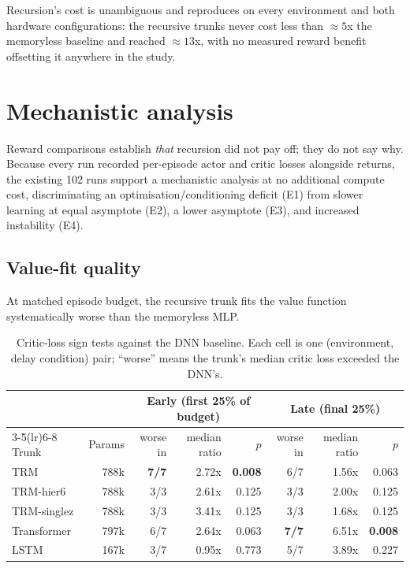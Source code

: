 \documentclass[11pt]{article}
\begin{document}
Recursion's cost is unambiguous and reproduces on every environment and both hardware configurations: the recursive trunks never cost less than ${\approx}5$x the memoryless baseline and reached ${\approx}13$x, with no measured reward benefit offsetting it anywhere in the study.

\section{Mechanistic analysis}
\label{sec:mechanism}

Reward comparisons establish \emph{that} recursion did not pay off; they do not say why. Because every run recorded per-episode actor and critic losses alongside returns, the existing 102 runs support a mechanistic analysis at no additional compute cost, discriminating an optimisation/conditioning deficit (E1) from slower learning at equal asymptote (E2), a lower asymptote (E3), and increased instability (E4).

\subsection{Value-fit quality}

At matched episode budget, the recursive trunk fits the value function systematically worse than the memoryless MLP.

\begin{table}[h]
\centering
\small
\begin{tabular}{lrrrrrrr}
\toprule
 & & \multicolumn{3}{c}{Early (first 25\% of budget)} & \multicolumn{3}{c}{Late (final 25\%)} \\
\cmidrule(lr){3-5}\cmidrule(lr){6-8}
Trunk & Params & worse in & median ratio & $p$ & worse in & median ratio & $p$ \\
\midrule
TRM & 788k & \textbf{7/7} & 2.72x & \textbf{0.008} & 6/7 & 1.56x & 0.063 \\
TRM-hier6 & 788k & 3/3 & 2.61x & 0.125 & 3/3 & 2.00x & 0.125 \\
TRM-singlez & 788k & 3/3 & 3.41x & 0.125 & 3/3 & 1.68x & 0.125 \\
Transformer & 797k & 6/7 & 2.64x & 0.063 & \textbf{7/7} & 6.51x & \textbf{0.008} \\
LSTM & 167k & 3/7 & 0.95x & 0.773 & 5/7 & 3.89x & 0.227 \\
\bottomrule
\end{tabular}
\caption{Critic-loss sign tests against the DNN baseline. Each cell is one (environment, delay condition) pair; ``worse'' means the trunk's median critic loss exceeded the DNN's.}
\label{tab:critic}
\end{table}
\end{document}
